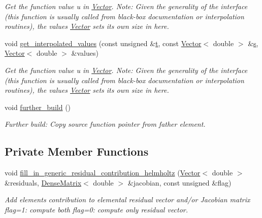 \begin{DoxyCompactItemize}
\begin{DoxyCompactList}\small\item\em Get the function value u in \hyperlink{classoomph_1_1Vector}{Vector}. Note\+: Given the generality of the interface (this function is usually called from black-\/box documentation or interpolation routines), the values \hyperlink{classoomph_1_1Vector}{Vector} sets its own size in here. \end{DoxyCompactList}\item 
void \hyperlink{classoomph_1_1RefineablePMLHelmholtzEquations_a67107290248b8f9d921a24c1fca94e47}{get\+\_\+interpolated\+\_\+values} (const unsigned \&\hyperlink{cfortran_8h_af6f0bd3dc13317f895c91323c25c2b8f}{t}, const \hyperlink{classoomph_1_1Vector}{Vector}$<$ double $>$ \&\hyperlink{cfortran_8h_ab7123126e4885ef647dd9c6e3807a21c}{s}, \hyperlink{classoomph_1_1Vector}{Vector}$<$ double $>$ \&values)
\begin{DoxyCompactList}\small\item\em Get the function value u in \hyperlink{classoomph_1_1Vector}{Vector}. Note\+: Given the generality of the interface (this function is usually called from black-\/box documentation or interpolation routines), the values \hyperlink{classoomph_1_1Vector}{Vector} sets its own size in here. \end{DoxyCompactList}\item 
void \hyperlink{classoomph_1_1RefineablePMLHelmholtzEquations_a9e3eb293598208404f88bc1c36003d6a}{further\+\_\+build} ()
\begin{DoxyCompactList}\small\item\em Further build\+: Copy source function pointer from father element. \end{DoxyCompactList}\end{DoxyCompactItemize}
\subsection*{Private Member Functions}
\begin{DoxyCompactItemize}
\item 
void \hyperlink{classoomph_1_1RefineablePMLHelmholtzEquations_aac773b707acf42233bd8b65ca6af5d5f}{fill\+\_\+in\+\_\+generic\+\_\+residual\+\_\+contribution\+\_\+helmholtz} (\hyperlink{classoomph_1_1Vector}{Vector}$<$ double $>$ \&residuals, \hyperlink{classoomph_1_1DenseMatrix}{Dense\+Matrix}$<$ double $>$ \&jacobian, const unsigned \&flag)
\begin{DoxyCompactList}\small\item\em Add element\textquotesingle{}s contribution to elemental residual vector and/or Jacobian matrix flag=1\+: compute both flag=0\+: compute only residual vector. \end{DoxyCompactList}\end{DoxyCompactItemize}
